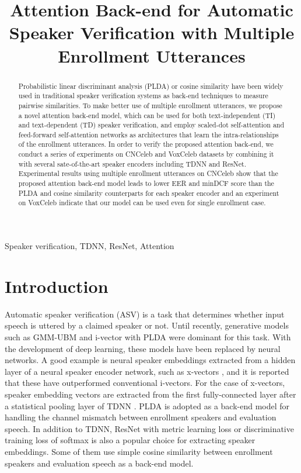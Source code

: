 \documentclass{article}
\title{Attention Back-end for Automatic Speaker Verification with Multiple Enrollment Utterances}
\begin{document}
\ninept
\maketitle
\begin{abstract}
Probabilistic linear discriminant analysis (PLDA) or cosine similarity have been widely used in traditional speaker verification systems as back-end techniques to measure pairwise similarities. 
To make better use of multiple enrollment utterances, 
we propose a novel attention back-end model, which can be used for both text-independent (TI) and text-dependent (TD) speaker verification, and employ scaled-dot self-attention and feed-forward self-attention networks as architectures that learn the intra-relationships of the enrollment utterances.  
In order to verify the proposed attention back-end, we conduct a series of experiments on CNCeleb and VoxCeleb datasets by combining it with several sate-of-the-art speaker encoders including TDNN and ResNet. 
Experimental results using multiple enrollment utterances on CNCeleb show that the proposed attention back-end model leads to lower EER and minDCF score than the PLDA and cosine similarity counterparts for each speaker encoder 
and an experiment on VoxCeleb indicate that our model can be used even for single enrollment case. 
\end{abstract}
\begin{keywords}
Speaker verification, TDNN, ResNet, Attention
\end{keywords}
\section{Introduction}
\vspace{-1mm}
\label{sec:intro}

Automatic speaker verification (ASV) is a task that determines whether input speech is uttered by a claimed speaker or not. 
Until recently, generative models such as GMM-UBM \cite{Reynolds2000-GMMUBM} and i-vector \cite{Dehak2010-IV} with PLDA \cite{Ioffe2006-PLDA} were dominant for this task. With the development of deep learning, these models have been replaced by neural networks.
A good example is neural speaker embeddings \cite{Variani2014-DV, Snyder2017-DNNE} extracted from a hidden layer of a neural speaker encoder network, such as x-vectors \cite{Snyder2018-XV, Raj2019-XVProbe}, and it is reported that these have outperformed conventional i-vectors. For the case of x-vectors, speaker embedding vectors are extracted from the first fully-connected layer after a statistical pooling layer of TDNN \cite{Snyder2017-DNNE}. PLDA is adopted as a back-end model for handling the channel mismatch between enrollment speakers and evaluation speech. In addition to TDNN, ResNet \cite{He2016-ResNet} with metric learning loss \cite{Li2017-DS, defence} or discriminative training loss of softmax \cite{Liu2017-Angular, Wang2018-AM} is also a popular choice for extracting speaker embeddings. Some of them use 
simple cosine similarity between enrollment speakers and evaluation speech as a back-end model. 
\end{document}
